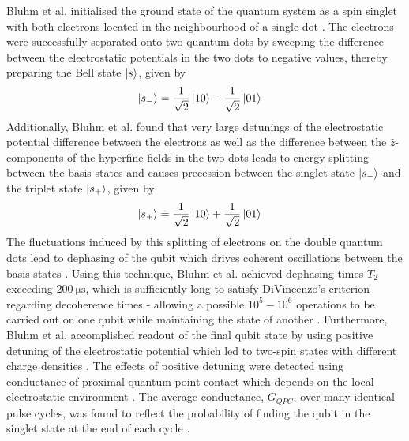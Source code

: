 Bluhm et al. initialised the ground state of the quantum system as a spin singlet with both electrons located in the neighbourhood of a single dot \cite{bluhm2011dephasing}. The electrons were successfully separated onto two quantum dots by sweeping the difference between the electrostatic potentials in the two dots to negative values, thereby preparing the Bell state $\ket{s}$, given by
\begin{align}\label{eqn:s-}
	\ket{s_-}	& = \frac{1}{\sqrt{2}}\ket{10} - \frac{1}{\sqrt{2}}\ket{01}
\end{align}
Additionally, Bluhm et al. found that very large detunings of the electrostatic potential difference between the electrons as well as the difference between the $\hat{z}$-components of the hyperfine fields in the two dots leads to energy splitting between the basis states and causes precession between the singlet state $\ket{s_-}$ and the triplet state $\ket{s_+}$, given by
\begin{align}\label{eqn:s+}
	\ket{s_+} & = \frac{1}{\sqrt{2}}\ket{10} + \frac{1}{\sqrt{2}}\ket{01}
\end{align}
The fluctuations induced by this splitting of electrons on the double quantum dots lead to dephasing of the qubit which drives coherent oscillations between the basis states \cite{bluhm2011dephasing}. Using this technique, Bluhm et al. achieved dephasing times $T_2$ exceeding $\SI{200}{\micro\second}$, which is sufficiently long to satisfy DiVincenzo's criterion regarding decoherence times - allowing a possible $10^5-10^6$ operations to be carried out on one qubit while maintaining the state of another \cite{bluhm2011dephasing, divincenzo2000physical}. Furthermore, Bluhm et al. accomplished readout of the final qubit state by using positive detuning of the electrostatic potential which led to two-spin states with different charge densities \cite{bluhm2011dephasing}. The effects of positive detuning were detected using conductance of proximal quantum point contact which depends on the local electrostatic environment \cite{sundfors1969exchange}. The average conductance, $G_{QPC}$, over many identical pulse cycles, was found to reflect the probability of finding the qubit in the singlet state at the end of each cycle \cite{bluhm2011dephasing}. 


